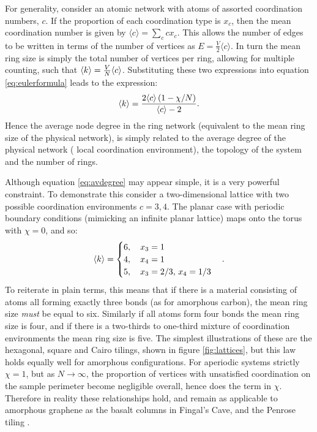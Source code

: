 For generality, consider an atomic network with atoms of assorted coordination numbers, $c$. 
If the proportion of each coordination type is $x_c$, then the mean coordination number is given by $\langle c \rangle = \sum\limits_c cx_c$.
This allows the number of edges to be written in terms of the number of vertices as $E=\frac{V}{2}\langle c \rangle$. 
In turn the mean ring size is simply the total number of vertices per ring, allowing for multiple counting, such that $\langle k \rangle=\frac{V}{N}\langle c \rangle$.
Substituting these two expressions into equation \eqref{eq:eulerformula} leads to the expression:
\begin{equation}
	\label{eq:avdegree}
	\langle k \rangle = \frac{2\langle c \rangle\left(1-\chi/N\right)}{\langle c \rangle - 2}.
\end{equation}
Hence the average node degree in the ring network (equivalent to the mean ring size of the physical network), is simply related to the average degree of the physical network (\ie{} local coordination environment), the topology of the system and the number of rings.

Although equation \eqref{eq:avdegree} may appear simple, it is a very powerful constraint. 
To demonstrate this consider a two\--dimensional lattice with two possible coordination environments $c=3,4$. 
The planar case with periodic boundary conditions (mimicking an infinite planar lattice) maps onto the torus with $\chi=0$, and so:
\begin{equation}
	\label{eq:2dplanarcases}
	\langle k \rangle = \begin{cases}
		6, \quad x_3 = 1 \\
		4, \quad x_4 = 1 \\
		5, \quad x_3 = 2/3,\, x_4 =1/3
	\end{cases}.
\end{equation}
To reiterate in plain terms, this means that if there is a material consisting of atoms all forming exactly three bonds (as for amorphous carbon), the mean ring size \textit{must} be equal to six. 
Similarly if all atoms form four bonds the mean ring size is four, and if there is a two\--thirds to one\--third mixture of coordination environments the mean ring size is five.
The simplest illustrations of these are the hexagonal, square and Cairo  tilings, shown in figure \ref{fig:lattices}, but this law holds equally well for amorphous configurations.
For aperiodic systems strictly $\chi=1$, but as $N\rightarrow \infty$, the proportion of vertices with unsatisfied coordination on the sample perimeter become negligible overall, hence does the term in $\chi$.
Therefore in reality these relationships hold, and remain as applicable to amorphous graphene as the basalt columns in Fingal's Cave, and the Penrose tiling \cite{Goehring2014,Ressouche2009}.

